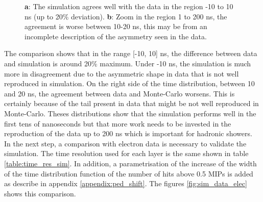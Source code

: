 \documentclass[twoside,a4paper,11pt]{article}
\begin{document}
\begin{figure}[htbp]
	\hfill
	\caption[]{\textbf{a}: The simulation agrees well with the data in the region -10 to 10 ns (up to 20\% deviation). \textbf{b}: Zoom in the region 1 to 200 ns, the agreement is worse between 10-20 ns, this may be from an incomplete description of the asymmetry seen in the data.}
	\label{fig:sim_data_muon}
\end{figure}
The comparison shows that in the range [-10, 10] ns, the difference between data and simulation is around 20\% maximum. Under -10 ns, the simulation is much more in disagreement due to the asymmetric shape in data that is not well reproduced in simulation. On the right side of the time distribution, between 10 and 20 ns, the agreement between data and Monte-Carlo worsens. This is certainly because of the tail present in data that might be not well reproduced in Monte-Carlo. Theses distributions show that the simulation performs well in the first tens of nanoseconds but that more work needs to be invested in the reproduction of the data up to 200 ns which is important for hadronic showers.\\
In the next step, a comparison with electron data is necessary to validate the simulation. The time resolution used for each layer is the same shown in table \ref{table:time_res_sim}. In addition, a parametrisation of the increase of the width of the time distribution function of the number of hits above 0.5 MIPs is added as describe in appendix \ref{appendix:ped_shift}. The figures \ref{fig:sim_data_elec} shows this comparison.
\end{document}
